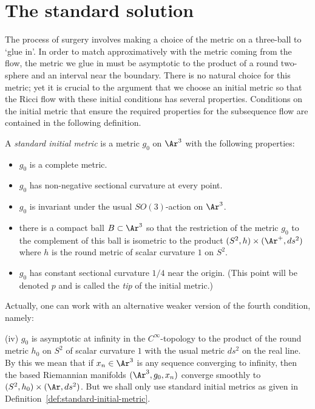 \chapter{The standard solution}
\label{chap:standard-solution}
\label{stdsolnsect}

The process of surgery involves making a choice of the metric on a
three-ball to `glue in'. In order to match approximatively with the
metric coming from the flow, the metric we glue in must be
asymptotic to the product of a round two-sphere and an interval near
the boundary. There is no natural choice for this metric; yet it is
crucial to the argument that we choose an initial metric so that the
Ricci flow with these initial conditions has several properties.
Conditions on the initial metric that  ensure the required
properties for the subsequence flow are contained in the following
definition.


\begin{definition}
\label{def:standard-initial-metric}
\label{defn:stinmetr}
A {\em standard initial metric}
is a metric $g_0$ on $\Ar^3$ with the following properties:
\begin{itemize}
\item $g_0$ is a complete metric.
\item $g_0$ has non-negative sectional curvature at every point.
\item $g_0$ is invariant under the usual $SO(3)$-action on $\Ar^3$.
\item there is a compact ball $B\subset \Ar^3$ so
that the restriction of the metric $g_0$ to the complement of this
ball is isometric to the product $(S^2,h)\times (\Ar^+,ds^2)$ where
$h$ is the round metric of scalar curvature $1$ on $S^2$.
\item $g_0$ has constant sectional curvature $1/4$ near the origin. (This point will be
denoted $p$ and is called the {\em tip} of the initial metric.)
\end{itemize}
\end{definition}

Actually, one can work with an alternative weaker version of the
fourth condition, namely:

\noindent (iv) $g_0$ is asymptotic at infinity in the
$C^\infty$-topology to the product of the round metric $h_0$ on
$S^2$ of  scalar curvature $1$ with the usual metric $ds^2$ on the
real line. By this we mean  that if $x_n\in \Ar^3$ is any sequence
converging to infinity, then the based Riemannian manifolds
$(\Ar^3,g_0,x_n)$ converge smoothly to $(S^2,h_0)\times (\Ar,ds^2)$.
But we shall only use standard initial metrics as given in
Definition~\ref{def:standard-initial-metric}.




